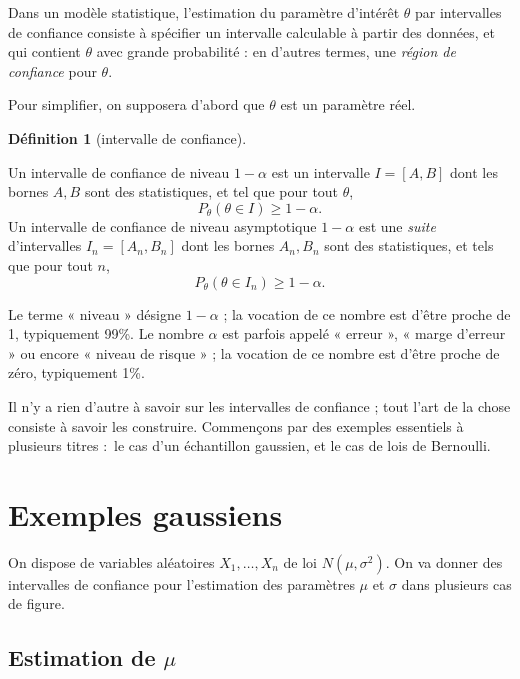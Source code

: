\documentclass[
  10,
  letterpaper,
  DIV=11,
  numbers=noendperiod]{scrreport}
\theoremstyle{plain}
\theoremstyle{definition}
\theoremstyle{plain}
\theoremstyle{definition}
\newtheorem{definition}{Définition}[chapter]
\theoremstyle{definition}
\theoremstyle{plain}
\theoremstyle{remark}
\begin{document}
Dans un modèle statistique, l'estimation du paramètre d'intérêt
\(\theta\) par intervalles de confiance consiste à spécifier un
intervalle calculable à partir des données, et qui contient \(\theta\)
avec grande probabilité : en d'autres termes, une \emph{région de
confiance} pour \(\theta\).

Pour simplifier, on supposera d'abord que \(\theta\) est un paramètre
réel.

\begin{definition}[intervalle de
confiance]\protect\hypertarget{def-ic}{}\label{def-ic}

Un intervalle de confiance de niveau \(1-\alpha\) est un intervalle
\(I = [A,B]\) dont les bornes \(A,B\) sont des statistiques, et tel que
pour tout \(\theta\), \[P_\theta(\theta \in I) \geqslant 1 - \alpha.\]
Un intervalle de confiance de niveau asymptotique \(1-\alpha\) est une
\emph{suite} d'intervalles \(I_n = [A_n,B_n]\) dont les bornes
\(A_n,B_n\) sont des statistiques, et tels que pour tout \(n\),
\[ P_\theta(\theta \in I_n) \geqslant 1 - \alpha.\]

\end{definition}

Le terme « niveau » désigne \(1-\alpha\) ; la vocation de ce nombre est
d'être proche de 1, typiquement 99\%. Le nombre \(\alpha\) est parfois
appelé « erreur », « marge d'erreur » ou encore « niveau de risque » ;
la vocation de ce nombre est d'être proche de zéro, typiquement 1\%.

Il n'y a rien d'autre à savoir sur les intervalles de confiance ; tout
l'art de la chose consiste à savoir les construire. Commençons par des
exemples essentiels à plusieurs titres :~le cas d'un échantillon
gaussien, et le cas de lois de Bernoulli.

\hypertarget{exemples-gaussiens}{%
\section{Exemples gaussiens}\label{exemples-gaussiens}}

On dispose de variables aléatoires \(X_1, \dotsc, X_n\) de loi
\(N(\mu, \sigma^2)\). On va donner des intervalles de confiance pour
l'estimation des paramètres \(\mu\) et \(\sigma\) dans plusieurs cas de
figure.

\hypertarget{estimation-de-mu}{%
\subsection{\texorpdfstring{Estimation de
\(\mu\)}{Estimation de \textbackslash mu}}\label{estimation-de-mu}}
\end{document}
